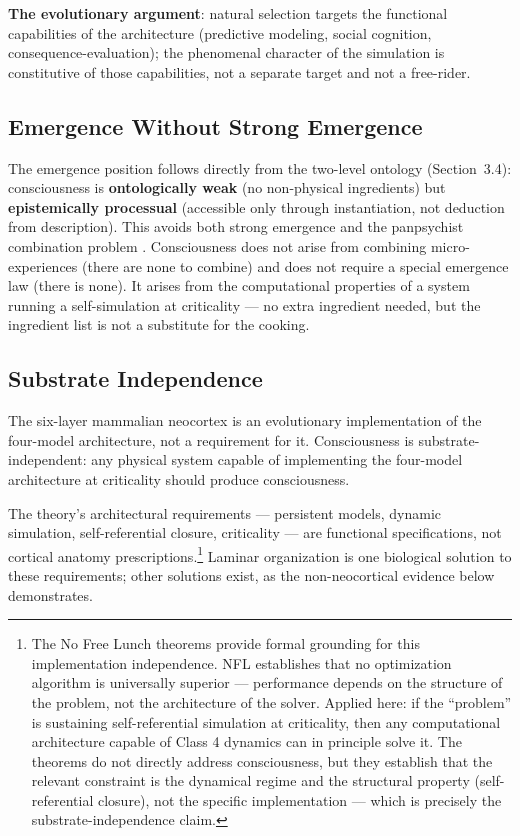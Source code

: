 \documentclass[12pt]{article}
\begin{document}
\textbf{The evolutionary argument}: natural selection targets the functional capabilities of the architecture (predictive modeling, social cognition, consequence-evaluation); the phenomenal character of the simulation is constitutive of those capabilities, not a separate target and not a free-rider.


\subsection{Emergence Without Strong Emergence}


The emergence position follows directly from the two-level ontology (Section~3.4): consciousness is \textbf{ontologically weak} (no non-physical ingredients) but \textbf{epistemically processual} (accessible only through instantiation, not deduction from description). This avoids both strong emergence \citep{Kim1993} and the panpsychist combination problem \citep{Chalmers2016}. Consciousness does not arise from combining micro-experiences (there are none to combine) and does not require a special emergence law (there is none). It arises from the computational properties of a system running a self-simulation at criticality --- no extra ingredient needed, but the ingredient list is not a substitute for the cooking.


\subsection{Substrate Independence}


The six-layer mammalian neocortex is an evolutionary implementation of the four-model architecture, not a requirement for it. Consciousness is substrate-independent: any physical system capable of implementing the four-model architecture at criticality should produce consciousness.

The theory's architectural requirements --- persistent models, dynamic simulation, self-referential closure, criticality --- are functional specifications, not cortical anatomy prescriptions.\footnote{The No Free Lunch theorems \citep{WolpertMacready1997} provide formal grounding for this implementation independence. NFL establishes that no optimization algorithm is universally superior --- performance depends on the structure of the problem, not the architecture of the solver. Applied here: if the ``problem'' is sustaining self-referential simulation at criticality, then any computational architecture capable of Class 4 dynamics can in principle solve it. The theorems do not directly address consciousness, but they establish that the relevant constraint is the dynamical regime and the structural property (self-referential closure), not the specific implementation --- which is precisely the substrate-independence claim.} Laminar organization is one biological solution to these requirements; other solutions exist, as the non-neocortical evidence below demonstrates.
\end{document}
